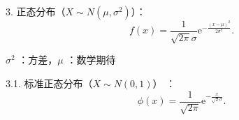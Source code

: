 3. 正态分布（$X\sim N\left( \mu,\sigma^{2} \right) $）：\[
    f\left( x \right) =\frac{1}{\sqrt{2\pi} \sigma}\mathrm{e}^{-\frac{\left( x-\mu \right) ^{2}}{2\sigma^{2}}}
.\] 

\begin{notation}
    $\sigma^{2}$ ：方差，$\mu$ ：数学期待
\end{notation}

3.1. 标准正态分布（$X\sim N\left( 0,1 \right) $） ：\[
\phi\left( x \right) =\frac{1}{\sqrt{2\pi}} \mathrm{e}^{-\frac{x}{\sqrt{2} \sigma}}
.\] 
